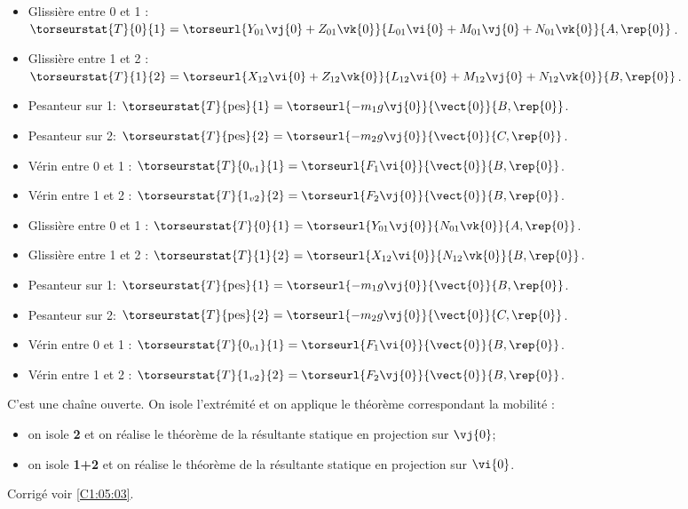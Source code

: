 \ifprof
{}
\ifprof
\begin{itemize}
\item Glissière entre 0 et 1 : $\torseurstat{T}{0}{1}=\torseurl{Y_{01}\vj{0}+Z_{01}\vk{0}}{L_{01}\vi{0}+M_{01}\vj{0}+N_{01}\vk{0}}{A,\rep{0}}$.
\item Glissière entre 1 et 2 : $\torseurstat{T}{1}{2}=\torseurl{X_{12}\vi{0}+Z_{12}\vk{0}}{L_{12}\vi{0}+M_{12}\vj{0}+N_{12}\vk{0}}{B,\rep{0}}$.
\item Pesanteur sur 1: $\torseurstat{T}{\text{pes}}{1}=\torseurl{-m_1g\vj{0}}{\vect{0}}{B,\rep{0}}$.
\item Pesanteur sur 2: $\torseurstat{T}{\text{pes}}{2}=\torseurl{-m_2g\vj{0}}{\vect{0}}{C,\rep{0}}$.
\item Vérin entre 0 et 1 : $\torseurstat{T}{0_{v1}}{1}=\torseurl{F_1\vi{0}}{\vect{0}}{B,\rep{0}}$.
\item Vérin entre 1 et 2 : $\torseurstat{T}{1_{v2}}{2}=\torseurl{F_2\vj{0}}{\vect{0}}{B,\rep{0}}$.
\end{itemize}
\else
\fi


\ifprof
\begin{itemize}
\item Glissière entre 0 et 1 : $\torseurstat{T}{0}{1}=\torseurl{Y_{01}\vj{0}}{N_{01}\vk{0}}{A,\rep{0}}$.
\item Glissière entre 1 et 2 : $\torseurstat{T}{1}{2}=\torseurl{X_{12}\vi{0}}{N_{12}\vk{0}}{B,\rep{0}}$.
\item Pesanteur sur 1: $\torseurstat{T}{\text{pes}}{1}=\torseurl{-m_1g\vj{0}}{\vect{0}}{B,\rep{0}}$.
\item Pesanteur sur 2: $\torseurstat{T}{\text{pes}}{2}=\torseurl{-m_2g\vj{0}}{\vect{0}}{C,\rep{0}}$.
\item Vérin entre 0 et 1 : $\torseurstat{T}{0_{v1}}{1}=\torseurl{F_1\vi{0}}{\vect{0}}{B,\rep{0}}$.
\item Vérin entre 1 et 2 : $\torseurstat{T}{1_{v2}}{2}=\torseurl{F_2\vj{0}}{\vect{0}}{B,\rep{0}}$.
\end{itemize}\else
\fi

\ifprof
C'est une chaîne ouverte. On isole l'extrémité et on applique le théorème correspondant la mobilité : 
\begin{itemize}
\item on isole \textbf{2} et on réalise le théorème de la résultante statique en projection sur $\vj{0}$;
\item on isole \textbf{1+2} et on réalise le théorème de la résultante statique en projection sur $\vi{0}$.
\end{itemize}
\else
\fi
\else
\fi

\ifprof
\else
\begin{flushright}
\footnotesize{Corrigé  voir \ref{C1:05:03}.}
\end{flushright}%
\fi